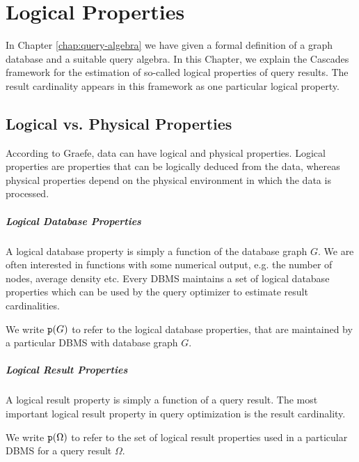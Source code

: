 \chapter{Logical Properties}
\label{chap:log-props-framework}

\begin{aboutchapter}
In Chapter \ref{chap:query-algebra} we have given a formal definition of a
graph database and a suitable query algebra.
In this Chapter, we explain the Cascades framework for the estimation
of so-called logical properties of query results. The result cardinality
appears in this framework as one particular logical property.
\end{aboutchapter}

\section{Logical vs. Physical Properties}

According to Graefe\cite{graefe_volcano_1993}, data can have logical and
physical properties.
Logical properties are properties that can be logically deduced from the data,
whereas physical properties depend on the physical
environment in which the data is processed.

\paragraph{Logical Database Properties}
\label{def:log-database-props}
  
A logical database property is simply a function of the database graph $G$.
We are often interested in functions with some numerical output, e.g. the
number of nodes, average density etc.
Every DBMS maintains a set of logical database properties which can be used
by the query optimizer to estimate result cardinalities.

We write $\texttt{p}(G)$ to refer to the logical database properties, that are
maintained by a particular DBMS with database graph $G$.

\paragraph{Logical Result Properties}
\label{def:log-result-props}
  
A logical result property is simply a function of a query result.
The most important logical result property in query optimization is the
result cardinality.

We write $\texttt{p}(\Omega)$ to refer to the set of logical result properties
used in a particular DBMS for a query result $\Omega$.

